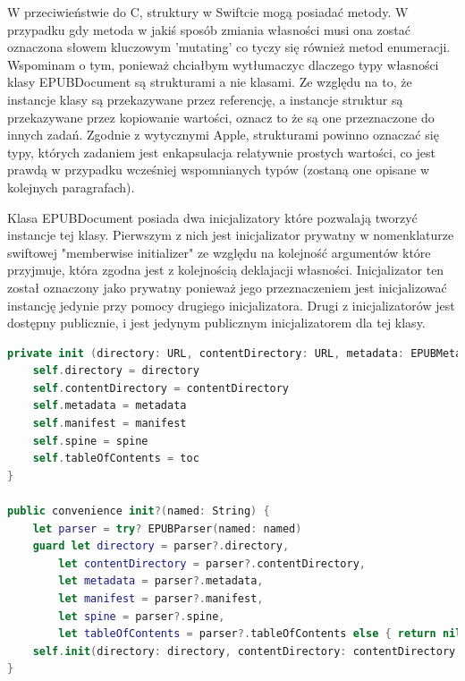 W przeciwieństwie do C, struktury w Swiftcie mogą posiadać metody. W przypadku gdy metoda w jakiś sposób zmiania własności musi ona zostać oznaczona słowem kluczowym 'mutating' co tyczy się również metod enumeracji. Wspominam o tym, ponieważ chciałbym wytłumaczyc dlaczego typy własności klasy EPUBDocument są strukturami a nie klasami. Ze względu na to, że instancje klasy są przekazywane przez referencję, a instancje struktur są przekazywane przez kopiowanie wartości, oznacz to że są one przeznaczone do innych zadań. Zgodnie z wytycznymi Apple, strukturami powinno oznaczać się typy, których zadaniem jest enkapsulacja relatywnie prostych wartości\cite{theSwiftProgrammingLanguageStructsPurpose}, co jest prawdą w przypadku wcześniej wspomnianych typów (zostaną one opisane w kolejnych paragrafach).

Klasa EPUBDocument posiada dwa inicjalizatory które pozwalają tworzyć instancje tej klasy. Pierwszym z nich jest inicjalizator prywatny w nomenklaturze swiftowej "memberwise initializer" ze względu na kolejność argumentów które przyjmuje, która zgodna jest z kolejnością deklajacji własności. Inicjalizator ten został oznaczony jako prywatny ponieważ jego przeznaczeniem jest inicjalizować instancję jedynie przy pomocy drugiego inicjalizatora. Drugi z inicjalizatorów jest dostępny publicznie, i jest jedynym publicznym inicjalizatorem dla tej klasy.

\begin{lstlisting}[caption={Inicjalizatory klasy EPUBDocument.}, language=swift]
private init (directory: URL, contentDirectory: URL, metadata: EPUBMetadata, manifest: EPUBManifest, spine: EPUBSpine, toc: EPUBTableOfContents) {
    self.directory = directory
    self.contentDirectory = contentDirectory
    self.metadata = metadata
    self.manifest = manifest
    self.spine = spine
    self.tableOfContents = toc
}

public convenience init?(named: String) {
    let parser = try? EPUBParser(named: named)
    guard let directory = parser?.directory,
        let contentDirectory = parser?.contentDirectory,
        let metadata = parser?.metadata,
        let manifest = parser?.manifest,
        let spine = parser?.spine,
        let tableOfContents = parser?.tableOfContents else { return nil }
    self.init(directory: directory, contentDirectory: contentDirectory, metadata: metadata, manifest: manifest, spine: spine, toc: tableOfContents)
}
\end{lstlisting}

